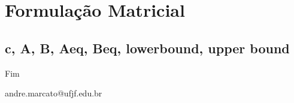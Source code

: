 \documentclass{beamer}
\begin{document}
\section{Formulação Matricial}
\subsection{c, A, B, Aeq, Beq, lowerbound, upper bound}


\begin{frame}
\centering
\Huge{\centerline{Fim}}
andre.marcato@ufjf.edu.br
\end{frame}

\end{document}
